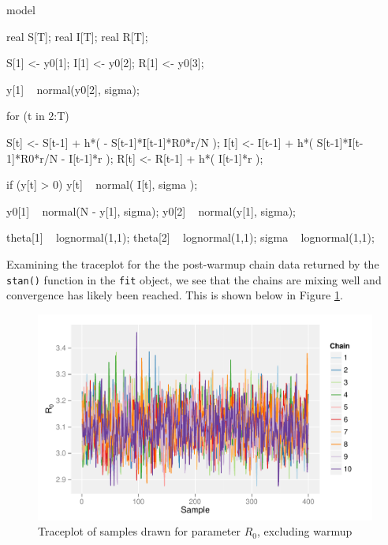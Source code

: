 \documentclass[12pt]{article}
\begin{document}
    \begin{Stan}
    model {

        real S[T];
        real I[T];
        real R[T];

        S[1] <- y0[1];
        I[1] <- y0[2];
        R[1] <- y0[3];
        
        y[1] ~ normal(y0[2], sigma);

        for (t in 2:T) {

            S[t] <- S[t-1] + h*( - S[t-1]*I[t-1]*R0*r/N );
            I[t] <- I[t-1] + h*( S[t-1]*I[t-1]*R0*r/N  - I[t-1]*r );
            R[t] <- R[t-1] + h*( I[t-1]*r );
            
            if (y[t] > 0) {
                y[t] ~ normal( I[t], sigma );
            }

        }
        
        y0[1] ~ normal(N - y[1], sigma);
        y0[2] ~ normal(y[1], sigma);
        
        theta[1]    ~ lognormal(1,1);
        theta[2]    ~ lognormal(1,1);
        sigma       ~ lognormal(1,1);
            
    }
    \end{Stan}

    Examining the traceplot for the the post-warmup chain data returned by the \verb|stan()| function in the \verb|fit| object, we see that the chains are mixing well and convergence has likely been reached. This is shown below in Figure \ref{traceplot}.

    \begin{figure}[H]
        \centering
        \includegraphics[width=\textwidth]{./images/traceplotR0.pdf}
        \caption{Traceplot of samples drawn for parameter $R_0$, excluding warmup}
        \label{traceplot}
    \end{figure}
\end{document}
